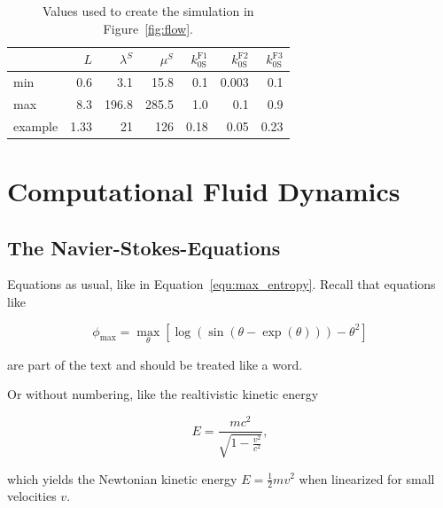 \documentclass[11pt,table]{article}
\begin{document}
\lipsum[2-3]


\begin{table}
	\centering
	\begin{tabular}{@{} lrrrrrr @{}} 
		\toprule
		 & $L$ & $\lambda^S$ & $\mu^S$ & $k_{0\text{S}}^{\text{F}1}$ & $k_{0\text{S}}^{\text{F}2}$ & $k_{0\text{S}}^{\text{F}3}$ \\
		\midrule
		min & 0.6 & 3.1 & 15.8 & 0.1 & 0.003 & 0.1 \\
		max & 8.3 & 196.8 & 285.5 & 1.0 & 0.1 & 0.9 \\
		example & 1.33 & 21 & 126 & 0.18 & 0.05 & 0.23 \\
		\bottomrule
	\end{tabular}
	\caption{Values used to create the simulation in Figure~\ref{fig:flow}.}\label{tab:other_parameters}
\end{table}


\section{Computational Fluid Dynamics}

\subsection{The Navier-Stokes-Equations}

Equations as usual, like in Equation~\ref{equ:max_entropy}. Recall that equations like

\begin{equation}\label{equ:max_entropy}
	\phi_\mathrm{max} = \max_{\theta} \left[ \log(\sin(\theta - \exp(\theta))) - \theta^2 \right]
\end{equation}

are part of the text and should be treated like a word.

\lipsum[1]

Or without numbering, like the realtivistic kinetic energy 

\begin{equation*}
	E = \frac{mc^2}{\sqrt{1 - \frac{v^2}{c^2}}},
\end{equation*}

which yields the Newtonian kinetic energy $E = \frac 1 2 m v^2$ when linearized for small velocities $v$.
\end{document}
